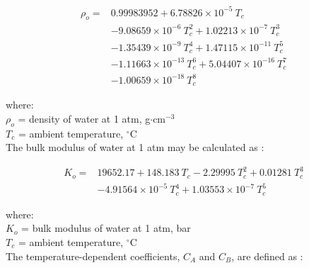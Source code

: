 \begin{equation}
\label{eq:datm}
	\begin{split}
		\rho_o = & 0.99983952 + 6.78826\times 10^{-5}\: T_c \\
		          & -9.08659\times 10^{-6}\: T_c^2 + 1.02213\times 10^{-7}\: T_c^3\\
		          &-1.35439\times 10^{-9}\: T_c^4 + 1.47115\times 10^{-11}\: T_c^5\\
		          &-1.11663\times 10^{-13}\: T_c^6 + 5.04407\times 10^{-16}\: T_c^7\\
		          &-1.00659\times 10^{-18}\: T_c^8
	\end{split}
\end{equation}

\noindent where: \\
\indent $\rho_o$ = density of water at 1 atm, g$\cdot$cm$^{-3}$\\
\indent $T_c$ = ambient temperature, $^{\circ}$C\\

\noindent The bulk modulus of water at 1 atm may be calculated as \parencite{chen77, kell75}:

\begin{equation}
\label{eq:bulk}
	\begin{split}
		K_o = & 19652.17 + 148.183\: T_c - 2.29995\: T_c^2 +0.01281\: T_c^3 \\
		          & -4.91564\times 10^{-5}\: T_c^4 +1.03553\times 10^{-7}\: T_c^5
	\end{split}
\end{equation}

\noindent where: \\
\indent $K_o$ = bulk modulus of water at 1 atm, bar\\
\indent $T_c$ = ambient temperature, $^{\circ}$C\\

\noindent The temperature-dependent coefficients, $C_A$ and $C_B$, are defined as \parencite{chen77}:

